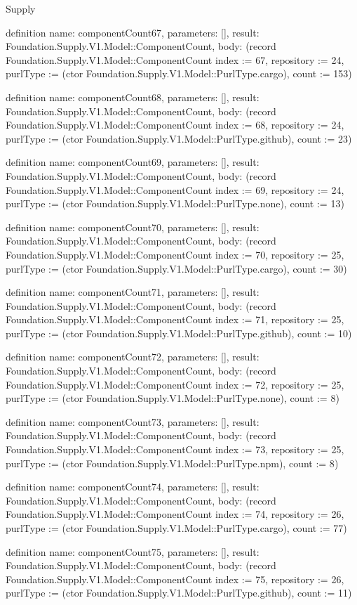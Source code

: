 \begin{lexlean}{Supply}
\begin{semanticmodule}
definition{
  name: componentCount67,
  parameters: [],
  result: Foundation.Supply.V1.Model::ComponentCount,
  body: (record Foundation.Supply.V1.Model::ComponentCount {index := 67, repository := 24, purlType := (ctor Foundation.Supply.V1.Model::PurlType.cargo), count := 153})
}

definition{
  name: componentCount68,
  parameters: [],
  result: Foundation.Supply.V1.Model::ComponentCount,
  body: (record Foundation.Supply.V1.Model::ComponentCount {index := 68, repository := 24, purlType := (ctor Foundation.Supply.V1.Model::PurlType.github), count := 23})
}

definition{
  name: componentCount69,
  parameters: [],
  result: Foundation.Supply.V1.Model::ComponentCount,
  body: (record Foundation.Supply.V1.Model::ComponentCount {index := 69, repository := 24, purlType := (ctor Foundation.Supply.V1.Model::PurlType.none), count := 13})
}

definition{
  name: componentCount70,
  parameters: [],
  result: Foundation.Supply.V1.Model::ComponentCount,
  body: (record Foundation.Supply.V1.Model::ComponentCount {index := 70, repository := 25, purlType := (ctor Foundation.Supply.V1.Model::PurlType.cargo), count := 30})
}

definition{
  name: componentCount71,
  parameters: [],
  result: Foundation.Supply.V1.Model::ComponentCount,
  body: (record Foundation.Supply.V1.Model::ComponentCount {index := 71, repository := 25, purlType := (ctor Foundation.Supply.V1.Model::PurlType.github), count := 10})
}

definition{
  name: componentCount72,
  parameters: [],
  result: Foundation.Supply.V1.Model::ComponentCount,
  body: (record Foundation.Supply.V1.Model::ComponentCount {index := 72, repository := 25, purlType := (ctor Foundation.Supply.V1.Model::PurlType.none), count := 8})
}

definition{
  name: componentCount73,
  parameters: [],
  result: Foundation.Supply.V1.Model::ComponentCount,
  body: (record Foundation.Supply.V1.Model::ComponentCount {index := 73, repository := 25, purlType := (ctor Foundation.Supply.V1.Model::PurlType.npm), count := 8})
}

definition{
  name: componentCount74,
  parameters: [],
  result: Foundation.Supply.V1.Model::ComponentCount,
  body: (record Foundation.Supply.V1.Model::ComponentCount {index := 74, repository := 26, purlType := (ctor Foundation.Supply.V1.Model::PurlType.cargo), count := 77})
}

definition{
  name: componentCount75,
  parameters: [],
  result: Foundation.Supply.V1.Model::ComponentCount,
  body: (record Foundation.Supply.V1.Model::ComponentCount {index := 75, repository := 26, purlType := (ctor Foundation.Supply.V1.Model::PurlType.github), count := 11})
}


\end{semanticmodule}
\end{lexlean}
